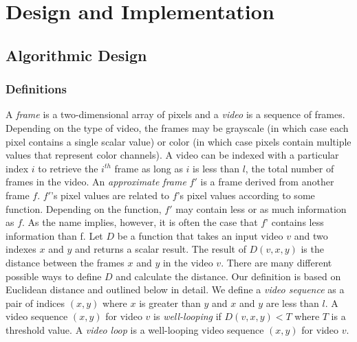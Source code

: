 \section{Design and Implementation}
\label{sec:DesignImplementation}
\subsection{Algorithmic Design}
\label{sec:AlgorithmicDesign}
\subsubsection{Definitions}
\label{sec:Definitions}
A \textit{frame} is a two-dimensional array of pixels and a \textit{video} is a sequence of frames. Depending on the type of video, the frames may be grayscale (in which case each pixel contains a single scalar value) or color (in which case pixels contain multiple values that represent color channels). A video can be indexed with a particular index $i$ to retrieve the $i^{th}$ frame as long as $i$ is less than $l$, the total number of frames in the video. 
An \textit{approximate frame} $f'$ is a frame derived from another frame $f$. $f'$'s pixel values are related to $f$'s pixel values according to some function. Depending on the function, $f'$ may contain less or as much information as $f$. As the name implies, however, it is often the case that $f’$ contains less information than f. 
Let $D$ be a function that takes an input video $v$ and two indexes $x$ and $y$ and returns a scalar result. The result of $D(v, x,y)$ is the distance between the frames $x$ and $y$ in the video $v$. There are many different possible ways to define $D$ and calculate the distance. Our definition is based on Euclidean distance and outlined below in detail.
We define a \textit{video sequence} as a pair of indices $(x,y)$ where $x$ is greater than $y$ and $x$ and $y$ are less than $l$. A video sequence $(x,y)$ for video $v$ is \textit{well-looping} if $D(v,x,y) < T$ where $T$ is a threshold value. A \textit{video loop} is a well-looping video sequence $(x,y)$ for video $v$.
